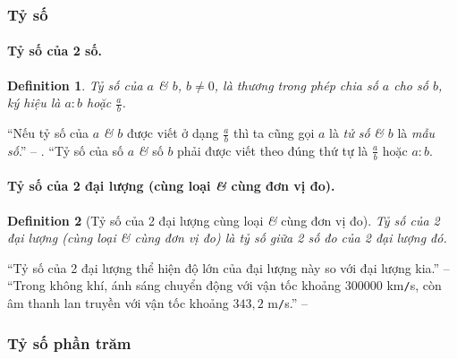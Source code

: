 \documentclass{article}
\numberwithin{equation}{section}
\newtheorem{definition}{Definition}[section]
\begin{document}
\subsubsection{Tỷ số}

\paragraph{Tỷ số của 2 số.}
\begin{definition}
	 \emph{Tỷ số} của $a$ \textit{\&} $b$, $b\ne 0$, là thương trong phép chia số $a$ cho số $b$, ký hiệu là $a:b$ hoặc $\frac{a}{b}$.
\end{definition}
``Nếu tỷ số của $a$ \textit{\&} $b$ được viết ở dạng $\frac{a}{b}$ thì ta cũng gọi $a$ là \textit{tử số} \textit{\&} $b$ là \textit{mẫu số}.'' -- \cite[p. 61]{Thai_Anh_Dat_Ha_Loan_Nam_Quang_Toan_6_tap_2}. ``Tỷ số của số $a$ \textit{\&} số $b$ phải được viết theo đúng thứ tự là $\frac{a}{b}$ hoặc $a:b$.

\paragraph{Tỷ số của 2 đại lượng (cùng loại \textit{\&} cùng đơn vị đo).}
\begin{definition}[Tỷ số của 2 đại lượng cùng loại \textit{\&} cùng đơn vị đo]
	\emph{Tỷ số của 2 đại lượng (cùng loại \textit{\&} cùng đơn vị đo)} là tỷ số giữa 2 số đo của 2 đại lượng đó.
\end{definition}
``Tỷ số của 2 đại lượng thể hiện độ lớn của đại lượng này so với đại lượng kia.'' -- \cite[p. 62]{Thai_Anh_Dat_Ha_Loan_Nam_Quang_Toan_6_tap_2} ``Trong không khí, ánh sáng chuyển động với vận tốc khoảng $300 000$ km\texttt{/}s, còn âm thanh lan truyền với vận tốc khoảng $343,2$ m\texttt{/}s.'' -- \cite[p. 63]{Thai_Anh_Dat_Ha_Loan_Nam_Quang_Toan_6_tap_2}

\subsubsection{Tỷ số phần trăm}
\end{document}
